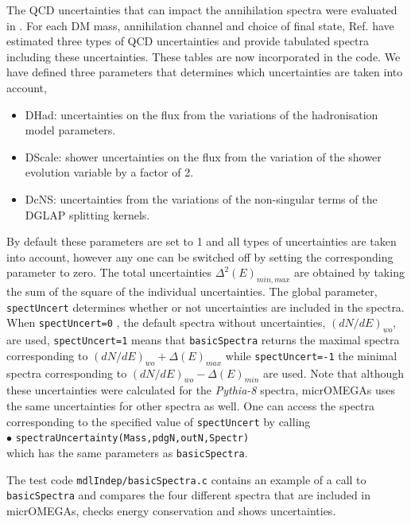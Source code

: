 \documentclass[12pt,a4paper]{article}
\begin{document}
The QCD uncertainties that can impact the  annihilation spectra  were evaluated in \cite{Jueid:2022qjg}. For each DM mass, annihilation channel and choice of final state, Ref.\cite{Jueid:2022qjg} have estimated three types of QCD uncertainties and provide tabulated spectra including these uncertainties.   These tables are now incorporated in the code. 
We have defined three parameters that determines which  uncertainties are taken into account,\begin{itemize}
   \item{DHad:}  uncertainties on the flux from the variations of the hadronisation model parameters.
   \item{DScale:} shower uncertainties on the flux from the variation of the shower evolution variable by a factor of 2.
   \item{DcNS:}  uncertainties  from the variations of the non-singular terms of the DGLAP splitting kernels. 
\end{itemize}
By default  these parameters are set to 1 and all types of uncertainties are taken into account, however any one can be switched off by setting  the corresponding parameter to zero. The total uncertainties $\Delta^2(E)_{min,max}$ are obtained by taking the sum of the square of the individual uncertainties. 
The global parameter, {\tt  spectUncert} determines whether or not uncertainties are included in the spectra. When  {\tt spectUncert=0} , the default spectra without uncertainties,  $(dN/dE)_{wo}$,  are used,  {\tt spectUncert=1} means that {\tt basicSpectra}  returns the maximal  spectra corresponding to $(dN/dE)_{wo}+\Delta(E)_{max}$  while 
 { \tt spectUncert=-1} the minimal spectra corresponding to $(dN/dE)_{wo}-\Delta(E)_{min}$  are used. 
 Note that although these uncertainties were calculated for the { \it Pythia-8} spectra,  micrOMEGAs uses the same uncertainties for other spectra as well. 
 One can access the spectra corresponding to the specified value of {\tt spectUncert} by calling
\\
$\bullet$ \verb|spectraUncertainty(Mass,pdgN,outN,Spectr)|\\
which has the same parameters as {\tt basicSpectra}. 


The test code  {\tt mdlIndep/basicSpectra.c} contains an example of a call to {\tt basicSpectra} and compares the four different spectra that are included in micrOMEGAs,   checks energy conservation and shows uncertainties.  \\

 
  
\end{document}
